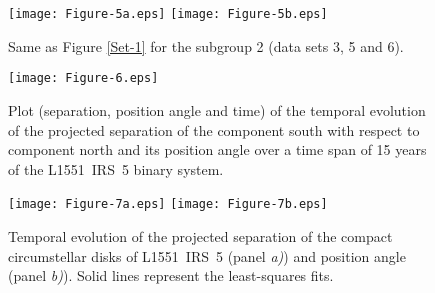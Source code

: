 \documentclass[debug]{rmaa}
\begin{document}
\begin{figure*}[ht]
  \texttt{[image: Figure-5a.eps]}
 \hfill
  \texttt{[image: Figure-5b.eps]}
   \caption{Same as Figure \ref{Set-1} for the subgroup 2 (data sets 3, 5 and 6).    }
  \label{Set-2}
\end{figure*}



\begin{figure}[ht]
    \texttt{[image: Figure-6.eps]}
 \caption{Plot (separation, position angle and time) of the temporal evolution
 of the projected separation of the component south with respect to component north
 and its position angle over a time span of 15 years
 of the  L1551~IRS~5 binary system.  }
  \label{Des-3D}
\end{figure}



\begin{figure*}[ht]
  \texttt{[image: Figure-7a.eps]}
 \hfill
  \texttt{[image: Figure-7b.eps]}
   \caption{Temporal evolution of the projected separation of the compact circumstellar
   disks of L1551~IRS~5 (panel {\it a)}) and 
   position angle (panel {\it b)}).  Solid lines represent the least-squares fits.
   }
  \label{Sep-PA}
\end{figure*}
\end{document}
